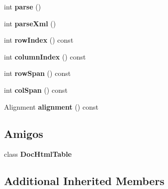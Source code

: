 \begin{DoxyCompactItemize}
\item 
\hypertarget{class_doc_html_cell_a67007fc2be130666fbf3b065022756f4}{int {\bfseries parse} ()}\label{class_doc_html_cell_a67007fc2be130666fbf3b065022756f4}

\item 
\hypertarget{class_doc_html_cell_a80866a0f93fec97bbcf5b54a48fd8ead}{int {\bfseries parse\-Xml} ()}\label{class_doc_html_cell_a80866a0f93fec97bbcf5b54a48fd8ead}

\item 
\hypertarget{class_doc_html_cell_a21ddbe149bd2ad1a2114e9adcd847923}{int {\bfseries row\-Index} () const }\label{class_doc_html_cell_a21ddbe149bd2ad1a2114e9adcd847923}

\item 
\hypertarget{class_doc_html_cell_a586db6ec9546460ae663e065e7107c97}{int {\bfseries column\-Index} () const }\label{class_doc_html_cell_a586db6ec9546460ae663e065e7107c97}

\item 
\hypertarget{class_doc_html_cell_a826ce56ff11d3637d36287bfd47fcdfc}{int {\bfseries row\-Span} () const }\label{class_doc_html_cell_a826ce56ff11d3637d36287bfd47fcdfc}

\item 
\hypertarget{class_doc_html_cell_aab9e80af34d11279544bea2b178cb7e8}{int {\bfseries col\-Span} () const }\label{class_doc_html_cell_aab9e80af34d11279544bea2b178cb7e8}

\item 
\hypertarget{class_doc_html_cell_aa539b506521f7f3d14c1befb6add5586}{Alignment {\bfseries alignment} () const }\label{class_doc_html_cell_aa539b506521f7f3d14c1befb6add5586}

\end{DoxyCompactItemize}
\subsection*{Amigos}
\begin{DoxyCompactItemize}
\item 
\hypertarget{class_doc_html_cell_a1f7413118a8c0d90c891a2695a7cb90d}{class {\bfseries Doc\-Html\-Table}}\label{class_doc_html_cell_a1f7413118a8c0d90c891a2695a7cb90d}

\end{DoxyCompactItemize}
\subsection*{Additional Inherited Members}


